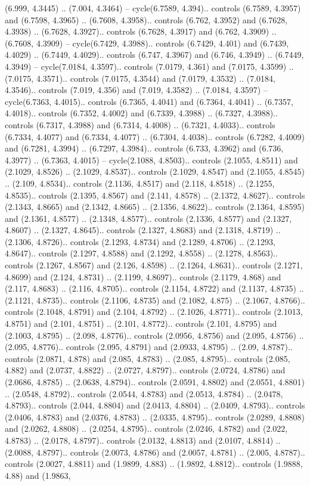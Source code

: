 (6.999, 4.3445) .. (7.004, 4.3464) -- cycle(6.7589, 4.394).. controls (6.7589, 4.3957) and (6.7598, 4.3965) .. (6.7608, 4.3958).. controls (6.762, 4.3952) and (6.7628, 4.3938) .. (6.7628, 4.3927).. controls (6.7628, 4.3917) and (6.762, 4.3909) .. (6.7608, 4.3909) -- cycle(6.7429, 4.3988).. controls (6.7429, 4.401) and (6.7439, 4.4029) .. (6.7449, 4.4029).. controls (6.747, 4.3967) and (6.746, 4.3949) .. (6.7449, 4.3949) -- cycle(7.0184, 4.3597).. controls (7.0179, 4.361) and (7.0175, 4.3599) .. (7.0175, 4.3571).. controls (7.0175, 4.3544) and (7.0179, 4.3532) .. (7.0184, 4.3546).. controls (7.019, 4.356) and (7.019, 4.3582) .. (7.0184, 4.3597) -- cycle(6.7363, 4.4015).. controls (6.7365, 4.4041) and (6.7364, 4.4041) .. (6.7357, 4.4018).. controls (6.7352, 4.4002) and (6.7339, 4.3988) .. (6.7327, 4.3988).. controls (6.7317, 4.3988) and (6.7314, 4.4008) .. (6.7321, 4.4033).. controls (6.7334, 4.4077) and (6.7334, 4.4077) .. (6.7304, 4.4038).. controls (6.7282, 4.4009) and (6.7281, 4.3994) .. (6.7297, 4.3984).. controls (6.733, 4.3962) and (6.736, 4.3977) .. (6.7363, 4.4015) -- cycle(2.1088, 4.8503).. controls (2.1055, 4.8511) and (2.1029, 4.8526) .. (2.1029, 4.8537).. controls (2.1029, 4.8547) and (2.1055, 4.8545) .. (2.109, 4.8534).. controls (2.1136, 4.8517) and (2.118, 4.8518) .. (2.1255, 4.8535).. controls (2.1395, 4.8567) and (2.141, 4.8578) .. (2.1372, 4.8627).. controls (2.1343, 4.8665) and (2.1342, 4.8665) .. (2.1356, 4.8622).. controls (2.1364, 4.8595) and (2.1361, 4.8577) .. (2.1348, 4.8577).. controls (2.1336, 4.8577) and (2.1327, 4.8607) .. (2.1327, 4.8645).. controls (2.1327, 4.8683) and (2.1318, 4.8719) .. (2.1306, 4.8726).. controls (2.1293, 4.8734) and (2.1289, 4.8706) .. (2.1293, 4.8647).. controls (2.1297, 4.8588) and (2.1292, 4.8558) .. (2.1278, 4.8563).. controls (2.1267, 4.8567) and (2.126, 4.8598) .. (2.1264, 4.8631).. controls (2.1271, 4.8699) and (2.124, 4.8731) .. (2.1199, 4.8697).. controls (2.1179, 4.868) and (2.117, 4.8683) .. (2.116, 4.8705).. controls (2.1154, 4.8722) and (2.1137, 4.8735) .. (2.1121, 4.8735).. controls (2.1106, 4.8735) and (2.1082, 4.875) .. (2.1067, 4.8766).. controls (2.1048, 4.8791) and (2.104, 4.8792) .. (2.1026, 4.8771).. controls (2.1013, 4.8751) and (2.101, 4.8751) .. (2.101, 4.8772).. controls (2.101, 4.8795) and (2.1003, 4.8795) .. (2.098, 4.8776).. controls (2.0956, 4.8756) and (2.095, 4.8756) .. (2.095, 4.8776).. controls (2.095, 4.8791) and (2.0933, 4.8795) .. (2.09, 4.8787).. controls (2.0871, 4.878) and (2.085, 4.8783) .. (2.085, 4.8795).. controls (2.085, 4.882) and (2.0737, 4.8822) .. (2.0727, 4.8797).. controls (2.0724, 4.8786) and (2.0686, 4.8785) .. (2.0638, 4.8794).. controls (2.0591, 4.8802) and (2.0551, 4.8801) .. (2.0548, 4.8792).. controls (2.0544, 4.8783) and (2.0513, 4.8784) .. (2.0478, 4.8793).. controls (2.044, 4.8804) and (2.0413, 4.8804) .. (2.0409, 4.8793).. controls (2.0406, 4.8783) and (2.0376, 4.8783) .. (2.0335, 4.8795).. controls (2.0289, 4.8808) and (2.0262, 4.8808) .. (2.0254, 4.8795).. controls (2.0246, 4.8782) and (2.022, 4.8783) .. (2.0178, 4.8797).. controls (2.0132, 4.8813) and (2.0107, 4.8814) .. (2.0088, 4.8797).. controls (2.0073, 4.8786) and (2.0057, 4.8781) .. (2.005, 4.8787).. controls (2.0027, 4.8811) and (1.9899, 4.883) .. (1.9892, 4.8812).. controls (1.9888, 4.88) and (1.9863, 